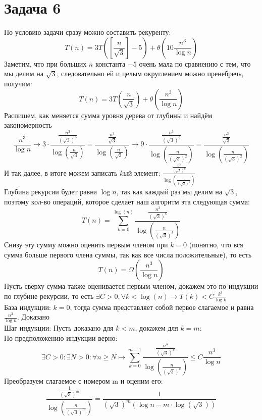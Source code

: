 \documentclass[a4paper,12pt]{article} %
\begin{document}
\section*{Задача 6}
По условию задачи сразу можно составить рекуренту:
\[ T(n)=3 T\left(\left[\frac{n}{\sqrt{3}}\right]-5\right)+\theta\left(10 \frac{n^{3}}{\log n}\right)\]
Заметим, что при больших $ n $ константа $ -5 $ очень мала по сравнению с тем, что мы делим на $ \sqrt{3} $, следовательно ей и целым округлением можно пренебречь, получим:
\[ T(n)=3 T\left(\frac{n}{\sqrt{3}}\right)+\theta\left(\frac{n^{3}}{\log n}\right)\]
Распишем, как меняется сумма уровня дерева от глубины и найдём закономерность
\[ \frac{n^{3}}{\log n} \rightarrow 3 \cdot \frac{\frac{n^{3}}{(\sqrt{3})^{3}}}{\log \left(\frac{n}{\sqrt{3}}\right)}=\frac{\frac{n^{3}}{\sqrt{3}}}{\log \left(\frac{n}{\sqrt{3}}\right)}\rightarrow 9 \cdot \frac{\frac{n^{3}}{(\sqrt{3})^{3}}}{\log \left(\frac{n}{(\sqrt{3})^{2}}\right)}=\frac{\frac{n^{3}}{\sqrt{3}}}{\log \left(\frac{n}{(\sqrt{3})^{2}}\right)}\]
И так далее, в итоге можем записать $ k $ый элемент:
$ \frac{\frac{n^{3}}{(\sqrt{3})^{k}}}{\log \left(\frac{n}{(\sqrt{3})^{k}}\right)}$\\
Глубина рекурсии будет равна $ \log n $, так как каждый раз мы делим на $ \sqrt{3} $, поэтому кол-во операций, которое сделает наш алгоритм эта следующая сумма:
\[T(n)=\sum\limits_{k=0}^{\log (n)} \frac{\frac{n^{3}}{(\sqrt{3})^{k}}}{\log \left(\frac{n}{(\sqrt{3})^{k}}\right)} \]
Снизу эту сумму можно оценить первым членом при $ k = 0 $ (понятно, что вся сумма больше первого члена суммы, так как все числа положительные), то есть  
\begin{equation}\label{niz}
T(n) = \Omega(\frac{n^{3}}{\log n})
\end{equation}
Пусть сверху сумма также оценивается первым членом, докажем это по индукции по глубине рекурсии, то есть 
$\exists C > 0, \forall k < \log(n) \longrightarrow T(k) < C\frac{k^{3}}{\log k}  $\\ 
База индукции: $k = 0$, тогда сумма представляет собой первое слагаемое и равна $\frac{n^{3}}{\log n}$. Доказано\\
Шаг индукции: Пусть доказано для $k < m$, докажем для $k = m$: \\
По предположению индукции верно:
\[\exists C>0: \exists N>0: \forall n \geq N \mapsto \sum_{k=0}^{m-1} \frac{\frac{n^{3}}{(\sqrt{3})^{k}}}{\log \left(\frac{n}{(\sqrt{3})^k}\right)} \leq C \frac{n^{3}}{\log n}\]
Преобразуем слагаемое с номером m и оценим его:
\[ \frac{\frac{1}{(\sqrt{3})^{m}}}{\log \left(\frac{n}{(\sqrt{3})^m}\right)} = \frac{1}{(\sqrt{3})^{m}(\log n-m \cdot \log (\sqrt{3}))}
\]\\
\end{document}
